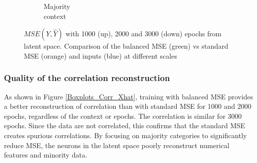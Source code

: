\documentclass{article}
\def \w {\widehat}
\theoremstyle{definition}
\begin{document}
\begin{figure}[ht]
\begin{subfigure}[b]{0.15\textwidth}
         \caption{Majority \\ context}
         \label{Prediction_Majo_X_Lat}
     \end{subfigure}
     \caption{$MSE(Y, \w Y)$ with 1000 (up), 2000 and 3000 (down) epochs from latent space. Comparison of the balanced MSE (green) vs standard MSE (orange) and inputs (blue) at different scales }
     \label{Prediction_X_lat}
\end{figure}




\subsubsection{Quality of the correlation reconstruction}

As shown in 
Figure \ref{Boxplots_Corr_Xhat}, training with balanced MSE provides a better reconstruction of correlation than with standard MSE for 1000 and 2000 epochs, regardless of the context or epochs. The correlation is similar for 3000 epochs. Since the data are not correlated, this confirms that the standard MSE creates spurious correlations. By focusing on majority categories to significantly reduce MSE, the neurons in the latent space poorly reconstruct numerical features and minority data.
\end{document}
